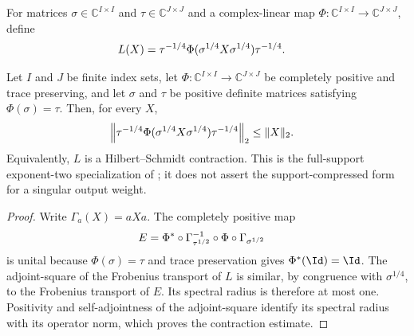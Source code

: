 \begin{definition}
    \label{def:weighted_hilbert_schmidt_map}
    \leanok
    For matrices $\sigma\in\mathbb C^{I\times I}$ and
    $\tau\in\mathbb C^{J\times J}$ and a complex-linear map
    $\Phi:\mathbb C^{I\times I}\to\mathbb C^{J\times J}$, define
    \begin{align}
        L(X)&=\tau^{-1/4}\Phi(\sigma^{1/4}X\sigma^{1/4})\tau^{-1/4}.
        \notag
    \end{align}
\end{definition}

\begin{theorem}
    \label{thm:weighted_hilbert_schmidt_contraction_full_support}
    \leanok
    Let $I$ and $J$ be finite index sets, let
    $\Phi:\mathbb C^{I\times I}\to\mathbb C^{J\times J}$ be completely
    positive and trace preserving, and let $\sigma$ and $\tau$ be positive
    definite matrices satisfying $\Phi(\sigma)=\tau$.  Then, for every $X$,
    \begin{align}
        \left\|\tau^{-1/4}
          \Phi(\sigma^{1/4}X\sigma^{1/4})\tau^{-1/4}\right\|_2
        &\leq \|X\|_2.
        \notag
    \end{align}
    Equivalently, $L$ is a Hilbert--Schmidt contraction.  This is the
    full-support exponent-two specialization of
    \cite[Theorem~6, Equation~(18)]{Beigi2013Sandwiched}; it does not assert
    the support-compressed form for a singular output weight.
\end{theorem}

\begin{proof}
    \leanok
    Write $\Gamma_a(X)=aXa$.  The completely positive map
    \begin{align}
        E&=\Phi^*\circ\Gamma_{\tau^{1/2}}^{-1}
             \circ\Phi\circ\Gamma_{\sigma^{1/2}}
        \notag
    \end{align}
    is unital because $\Phi(\sigma)=\tau$ and trace preservation gives
    $\Phi^*(\Id)=\Id$.  The adjoint-square of the Frobenius transport of $L$
    is similar, by congruence with $\sigma^{1/4}$, to the Frobenius transport
    of $E$.  Its spectral radius is therefore at most one.  Positivity and
    self-adjointness of the adjoint-square identify its spectral radius with
    its operator norm, which proves the contraction estimate.
\end{proof}

